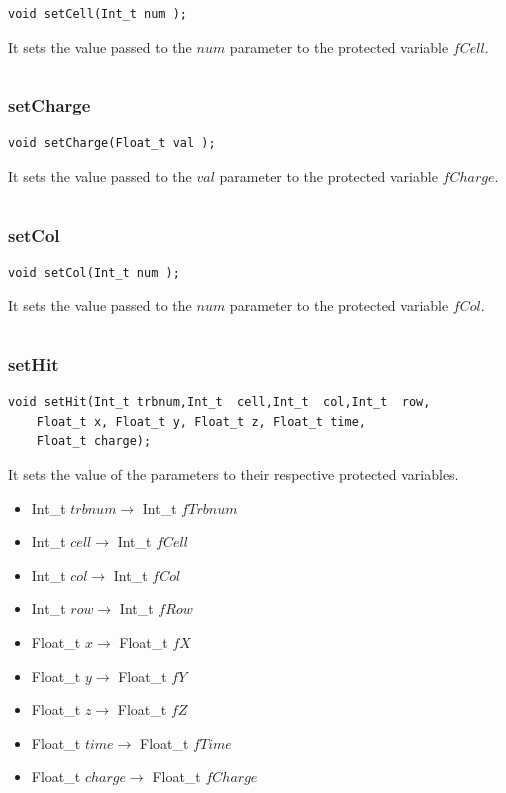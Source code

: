 \documentclass[a4paper]{book}
\begin{document}
\begin{lstlisting}
void setCell(Int_t num );
\end{lstlisting}

It sets the value passed to the $num$ parameter to the protected variable $fCell$.

\[\]

\subsubsection{setCharge}

\begin{lstlisting}
void setCharge(Float_t val );
\end{lstlisting}

It sets the value passed to the $val$ parameter to the protected variable $fCharge$.

\[\]

\subsubsection{setCol}

\begin{lstlisting}
void setCol(Int_t num );
\end{lstlisting}

It sets the value passed to the $num$ parameter to the protected variable $fCol$.

\[\]

\subsubsection{setHit}

\begin{lstlisting}
void setHit(Int_t trbnum,Int_t  cell,Int_t  col,Int_t  row,
	Float_t x, Float_t y, Float_t z, Float_t time,
	Float_t charge);
\end{lstlisting}

It sets the value of the parameters to their respective protected variables.

\begin{itemize}
	\item Int\_t $trbnum \rightarrow$ Int\_t $fTrbnum$
	\item Int\_t $cell \rightarrow$ Int\_t $fCell$
	\item Int\_t $col \rightarrow$ Int\_t $fCol$
	\item Int\_t $row \rightarrow$ Int\_t $fRow$
	\item Float\_t $x \rightarrow$ Float\_t $fX$
	\item Float\_t $y \rightarrow$ Float\_t $fY$
	\item Float\_t $z \rightarrow$ Float\_t $fZ$
	\item Float\_t $time \rightarrow$ Float\_t $fTime$
	\item Float\_t $charge \rightarrow$ Float\_t $fCharge$
\end{itemize}
\end{document}
